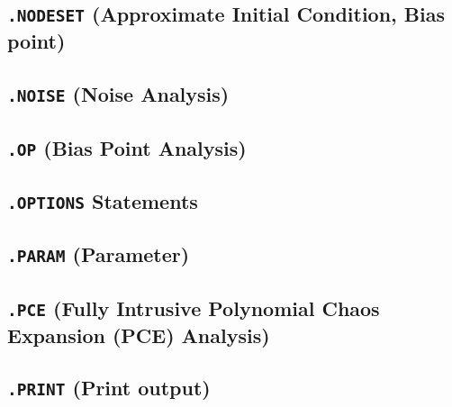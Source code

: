 \subsection{\texttt{.NODESET} (Approximate Initial Condition, Bias point)}


\newpage
\subsection{\texttt{.NOISE} (Noise Analysis) }
 



\newpage
\subsection{\texttt{.OP} (Bias Point Analysis)}


\newpage
\subsection{\texttt{.OPTIONS} Statements}


\newpage
\subsection{\texttt{.PARAM} (Parameter)}


\newpage
\subsection{\texttt{.PCE} (Fully Intrusive Polynomial Chaos Expansion (PCE) Analysis)}\label{.PCE}




\newpage
\subsection{\texttt{.PRINT} (Print output)}\label{.PRINT}


